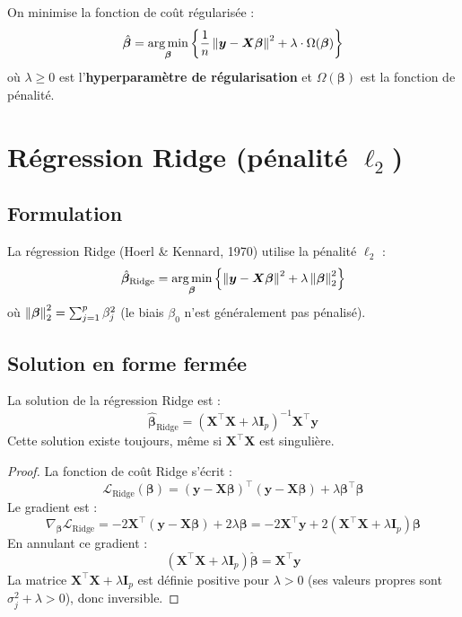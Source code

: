\begin{formules}[title=\textbf{Cadre g\'en\'eral de r\'egularisation}]
On minimise la fonction de co\^ut r\'egularis\'ee :
\[
  \hat{\bm{\beta}} = \argmin_{\bm{\beta}} \left\{
    \frac{1}{n}\norm{\bm{y} - \bm{X}\bm{\beta}}^2 + \lambda \cdot \Omega(\bm{\beta})
  \right\}
\]
o\`u $\lambda \geq 0$ est l'\textbf{hyperparam\`etre de r\'egularisation} et
$\Omega(\bm{\beta})$ est la fonction de p\'enalit\'e.
\end{formules}

\section{R\'egression Ridge (p\'enalit\'e $\ell_2$)}
\label{sec:ridge}

\subsection{Formulation}

\begin{definition}
La r\'egression Ridge (Hoerl \& Kennard, 1970) utilise la p\'enalit\'e $\ell_2$ :
\[
  \hat{\bm{\beta}}_{\text{Ridge}} = \argmin_{\bm{\beta}} \left\{
    \norm{\bm{y} - \bm{X}\bm{\beta}}^2 + \lambda \norm{\bm{\beta}}^2_2
  \right\}
\]
o\`u $\norm{\bm{\beta}}_2^2 = \sum_{j=1}^{p} \beta_j^2$ (le biais $\beta_0$ n'est
g\'en\'eralement pas p\'enalis\'e).
\end{definition}

\subsection{Solution en forme ferm\'ee}

\begin{theoreme}
\label{thm:ridge-solution}
La solution de la r\'egression Ridge est :
\[
  \hat{\bm{\beta}}_{\text{Ridge}} = (\bm{X}^\top \bm{X} + \lambda \bm{I}_p)^{-1}\bm{X}^\top \bm{y}
\]
Cette solution existe toujours, m\^eme si $\bm{X}^\top \bm{X}$ est singuli\`ere.
\end{theoreme}

\begin{proof}
La fonction de co\^ut Ridge s'\'ecrit :
\[
  \mathcal{L}_{\text{Ridge}}(\bm{\beta})
  = (\bm{y} - \bm{X}\bm{\beta})^\top(\bm{y} - \bm{X}\bm{\beta})
  + \lambda \bm{\beta}^\top \bm{\beta}
\]
Le gradient est :
\[
  \nabla_{\bm{\beta}} \mathcal{L}_{\text{Ridge}}
  = -2\bm{X}^\top(\bm{y} - \bm{X}\bm{\beta}) + 2\lambda \bm{\beta}
  = -2\bm{X}^\top \bm{y} + 2(\bm{X}^\top \bm{X} + \lambda \bm{I}_p)\bm{\beta}
\]
En annulant ce gradient :
\[
  (\bm{X}^\top \bm{X} + \lambda \bm{I}_p)\hat{\bm{\beta}} = \bm{X}^\top \bm{y}
\]
La matrice $\bm{X}^\top \bm{X} + \lambda \bm{I}_p$ est d\'efinie positive pour
$\lambda > 0$ (ses valeurs propres sont $\sigma_j^2 + \lambda > 0$), donc inversible.
\end{proof}

